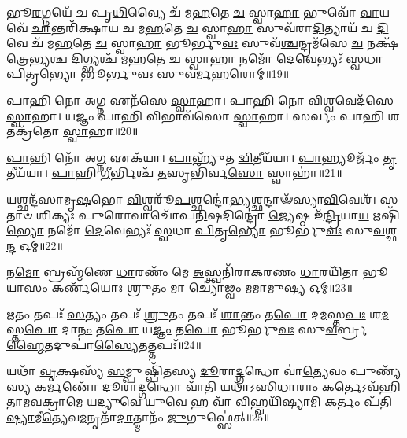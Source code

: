 𑌭𑍂\-\ul{𑌰}\-𑌗𑍍𑌨𑌯𑍇᳴ 𑌚 𑌪𑍃\-\ul{𑌥𑌿}\-𑌵𑍍𑌯𑍈 𑌚᳴ 𑌮\-\ul{𑌹}\-𑌤𑍇 \ul{𑌚} 𑌸𑍍𑌵𑌾\-\ul{𑌹𑌾} 𑌭𑍁𑌵𑍋᳴ \ul{𑌵𑌾}\-𑌯𑌵𑍇᳴ \ul{𑌚𑌾}\-𑌨𑍍𑌤𑌰𑌿᳴𑌕𑍍𑌷𑌾𑌯 𑌚 𑌮\-\ul{𑌹}\-𑌤𑍇 \ul{𑌚} 𑌸𑍍𑌵𑌾\-\ul{𑌹𑌾} 𑌸𑍁𑌵᳴𑌰𑌾\-\ul{𑌦𑌿}\-𑌤𑍍𑌯𑌾𑌯᳴ 𑌚 \ul{𑌦𑌿}\-𑌵𑍇 𑌚᳴ 𑌮\-\ul{𑌹}\-𑌤𑍇 \ul{𑌚} 𑌸𑍍𑌵𑌾\-\ul{𑌹𑌾} 𑌭𑍂𑌰𑍍𑌭𑍁\-\ul{𑌵𑌃} 𑌸𑍁𑌵᳴\-\ul{𑌶𑍍𑌚}\-𑌨𑍍𑌦𑍍𑌰𑌮᳴𑌸𑍇 \ul{𑌚} 𑌨𑌕𑍍𑌷᳴𑌤𑍍𑌰𑍇𑌭𑍍𑌯𑌶𑍍𑌚 \ul{𑌦𑌿}\-𑌗𑍍𑌭𑍍𑌯𑌶𑍍𑌚᳴ 𑌮\-\ul{𑌹}\-𑌤𑍇 \ul{𑌚} 𑌸𑍍𑌵𑌾\-\ul{𑌹𑌾} 𑌨𑌮𑍋᳴ \ul{𑌦𑍇}\-𑌵𑍇𑌭𑍍𑌯𑌃᳴ \ul{𑌸𑍍𑌵}\-𑌧𑌾 \ul{𑌪𑌿}\-𑌤𑍃\-\ul{𑌭𑍍𑌯𑍋} 𑌭𑍂𑌰𑍍𑌭𑍁\-\ul{𑌵𑌃} 𑌸𑍁\-\ul{𑌵}\-𑌰𑍍𑌮\-\ul{𑌹}\-𑌰𑍋𑌮𑍍॥19॥ 
\anuvakamend

𑌪𑌾𑌹𑌿 𑌨𑍋 𑌅𑌗𑍍𑌨 𑌏𑌨᳴𑌸𑍇 \ul{𑌸𑍍𑌵𑌾}\-𑌹𑌾। 
𑌪𑌾𑌹𑌿 𑌨𑍋 𑌵𑌿𑌶𑍍𑌵𑌵𑍇𑌦᳴𑌸𑍇 \ul{𑌸𑍍𑌵𑌾}\-𑌹𑌾। 
𑌯𑌜𑍍𑌞𑌂 𑌪𑌾𑌹𑌿 𑌵𑌿𑌭𑌾𑌵᳴𑌸𑍋 \ul{𑌸𑍍𑌵𑌾}\-𑌹𑌾। 
𑌸𑌰𑍍𑌵𑌂 𑌪𑌾𑌹𑌿 𑌶𑌤𑌕𑍍𑌰᳴𑌤𑍋 \ul{𑌸𑍍𑌵𑌾}\-𑌹𑌾॥20॥
\anuvakamend

\-\ul{𑌪𑌾}\-𑌹𑌿 𑌨𑍋᳴ 𑌅\-\ul{𑌗𑍍𑌨} 𑌏𑌕᳴𑌯𑌾। 
\-\ul{𑌪𑌾}\-𑌹𑍍𑌯𑍁᳴𑌤 \ul{𑌦𑍍𑌵𑌿}\-𑌤𑍀𑌯᳴𑌯𑌾। 
\-\ul{𑌪𑌾}\-𑌹𑍍𑌯𑍂𑌰𑍍𑌜𑌂᳴ \ul{𑌤𑍃}\-𑌤𑍀𑌯᳴𑌯𑌾। 
\-\ul{𑌪𑌾}\-𑌹𑌿 \ul{𑌗𑍀}\-𑌰𑍍𑌭𑌿𑌶𑍍𑌚᳴ \ul{𑌤}\-𑌸𑍃𑌭𑌿᳴𑌰𑍍𑌵\-\ul{𑌸𑍋} 𑌸𑍍𑌵𑌾𑌹𑌾॑॥21॥
\anuvakamend

𑌯𑌶𑍍𑌛𑌨𑍍𑌦᳴𑌸𑌾𑌮𑍃\-\ul{𑌷}\-𑌭𑍋 \ul{𑌵𑌿}\-𑌶𑍍𑌵𑌰𑍂᳴\-\ul{𑌪}\-𑌶𑍍𑌛𑌨𑍍𑌦𑍋॑\-\ul{𑌭𑍍𑌯}\-𑌶𑍍𑌛𑌨𑍍𑌦𑌾𑍟᳴𑌸𑍍𑌯𑌾\-\ul{𑌵𑌿}\-𑌵𑍇𑌶᳴। 
𑌸𑌤𑌾𑍞 𑌶𑌿𑌕𑍍𑌯𑌃 𑌪𑍁𑌰𑍋𑌵𑌾𑌚𑍋᳴𑌪\-\ul{𑌨𑌿}\-𑌷𑌦𑌿𑌨𑍍𑌦𑍍𑌰𑍋॑ \ul{𑌜𑍍𑌯𑍇}\-𑌷𑍍𑌠 𑌇᳴\-\ul{𑌨𑍍𑌦𑍍𑌰𑌿}\-𑌯𑌾\-\ul{𑌯} 𑌋𑌷𑌿᳴\-\ul{𑌭𑍍𑌯𑍋} 𑌨𑌮𑍋᳴ \ul{𑌦𑍇}\-𑌵𑍇𑌭𑍍𑌯𑌃᳴ \ul{𑌸𑍍𑌵}\-𑌧𑌾 \ul{𑌪𑌿}\-𑌤𑍃\-\ul{𑌭𑍍𑌯𑍋} 𑌭𑍂𑌰𑍍𑌭𑍁\-\ul{𑌵𑌃} 𑌸𑍁\-\ul{𑌵}\-𑌶𑍍𑌛\-\ul{𑌨𑍍𑌦} 𑌓𑌮𑍍॥22॥
\anuvakamend


𑌨\-\ul{𑌮𑍋} 𑌬𑍍𑌰𑌹𑍍𑌮᳴𑌣𑍇 \ul{𑌧𑌾}\-𑌰𑌣𑌂᳴ 𑌮𑍇 \ul{𑌅}\-𑌸𑍍𑌤𑍍𑌵𑌨𑌿᳴𑌰𑌾𑌕𑌰𑌣𑌂 \ul{𑌧𑌾}\-𑌰𑌯𑌿᳴𑌤𑌾 𑌭𑍂𑌯𑌾\-\ul{𑌸𑌂} 𑌕𑌰𑍍𑌣᳴𑌯𑍋𑌃 \ul{𑌶𑍍𑌰𑍁}\-𑌤𑌂 𑌮𑌾 𑌚𑍍𑌯𑍋॑\-\ul{𑌢𑍍𑌵𑌂} 𑌮\-\ul{𑌮𑌾}\-𑌮𑍁\-\ul{𑌷𑍍𑌯} 𑌓𑌮𑍍॥23॥
\anuvakamend

\-\ul{𑌋}\-𑌤𑌂 𑌤𑌪𑌃᳴ \ul{𑌸}\-𑌤𑍍𑌯𑌂 𑌤𑌪𑌃᳴ \ul{𑌶𑍍𑌰𑍁}\-𑌤𑌂 𑌤𑌪𑌃᳴ \ul{𑌶𑌾}\-𑌨𑍍𑌤𑌂 𑌤\-\ul{𑌪𑍋} 𑌦\-\ul{𑌮}\-𑌸𑍍𑌤\-\ul{𑌪𑌃} 𑌶\-\ul{𑌮}\-𑌸𑍍𑌤\-\ul{𑌪𑍋} 𑌦𑌾\-\ul{𑌨𑌂} 𑌤\-\ul{𑌪𑍋} 𑌯\-\ul{𑌜𑍍𑌞𑌂} 𑌤\-\ul{𑌪𑍋} 𑌭𑍂𑌰𑍍𑌭𑍁\-\ul{𑌵𑌃} 𑌸𑍁\-\ul{𑌵}\-𑌰𑍍𑌬𑍍𑌰\-\ul{𑌹𑍍𑌮𑍈}\-𑌤𑌦𑍁𑌪𑌾॑\-\ul{𑌸𑍍𑌯𑍈}\-𑌤𑌤𑍍𑌤𑌪𑌃᳴॥24॥
\anuvakamend


𑌯𑌥𑌾᳴ \ul{𑌵𑍃}\-𑌕𑍍𑌷𑌸𑍍𑌯᳴ \ul{𑌸}\-𑌮𑍍𑌪𑍁𑌷𑍍𑌪𑌿᳴𑌤𑌸𑍍𑌯 \ul{𑌦𑍂}\-𑌰𑌾\-\ul{𑌦𑍍𑌗}\-𑌨𑍍𑌧𑍋 𑌵𑌾॑\-\ul{𑌤𑍍𑌯𑍇}\-𑌵𑌂 𑌪𑍁𑌣𑍍𑌯᳴𑌸𑍍𑌯 \ul{𑌕}\-𑌰𑍍𑌮𑌣𑍋᳴ \ul{𑌦𑍂}\-𑌰𑌾\-\ul{𑌦𑍍𑌗}\-𑌨𑍍𑌧𑍋 𑌵𑌾᳴\-\ul{𑌤𑌿} 𑌯𑌥𑌾᳴𑌽𑌸𑌿\-\ul{𑌧𑌾}\-𑌰𑌾𑌂 \ul{𑌕}\-𑌰𑍍𑌤𑍇𑌽𑌵᳴𑌹𑌿𑌤𑌾𑌮\-\ul{𑌵}\-𑌕𑍍𑌰𑌾\-\ul{𑌮𑍇} 𑌯𑌦𑍍𑌯𑍁\-\ul{𑌵𑍇} 𑌯𑍁\-\ul{𑌵𑍇} 𑌹 𑌵𑌾᳴ \ul{𑌵𑌿}\-𑌹𑍍𑌵𑌯𑌿᳴𑌷𑍍𑌯𑌾𑌮𑌿 \ul{𑌕}\-𑌰𑍍𑌤𑌂 𑌪᳴𑌤𑌿\-\ul{𑌷𑍍𑌯𑌾}\-𑌮𑍀\-\ul{𑌤𑍍𑌯𑍇}\-𑌵\-\ul{𑌮}\-𑌨𑍃𑌤𑌾᳴\-\ul{𑌦𑌾}\-𑌤𑍍𑌮𑌾𑌨𑌂᳴ \ul{𑌜𑍁}\-𑌗𑍁𑌫𑍍𑌸𑍇॑𑌤𑍍॥25॥
\anuvakamend


